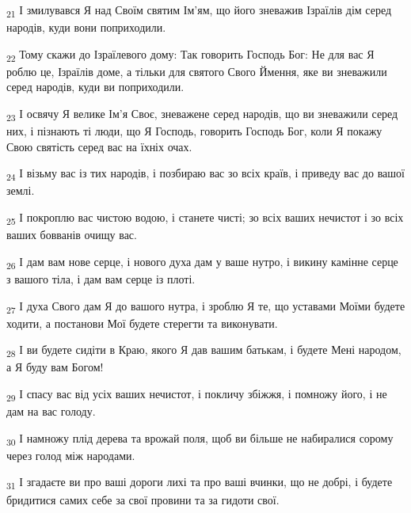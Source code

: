 \begin{tcolorbox}
\textsubscript{21} І змилувався Я над Своїм святим Ім'ям, що його зневажив Ізраїлів дім серед народів, куди вони поприходили.
\end{tcolorbox}
\begin{tcolorbox}
\textsubscript{22} Тому скажи до Ізраїлевого дому: Так говорить Господь Бог: Не для вас Я роблю це, Ізраїлів доме, а тільки для святого Свого Ймення, яке ви зневажили серед народів, куди ви поприходили.
\end{tcolorbox}
\begin{tcolorbox}
\textsubscript{23} І освячу Я велике Ім'я Своє, зневажене серед народів, що ви зневажили серед них, і пізнають ті люди, що Я Господь, говорить Господь Бог, коли Я покажу Свою святість серед вас на їхніх очах.
\end{tcolorbox}
\begin{tcolorbox}
\textsubscript{24} І візьму вас із тих народів, і позбираю вас зо всіх країв, і приведу вас до вашої землі.
\end{tcolorbox}
\begin{tcolorbox}
\textsubscript{25} І покроплю вас чистою водою, і станете чисті; зо всіх ваших нечистот і зо всіх ваших бовванів очищу вас.
\end{tcolorbox}
\begin{tcolorbox}
\textsubscript{26} І дам вам нове серце, і нового духа дам у ваше нутро, і викину камінне серце з вашого тіла, і дам вам серце із плоті.
\end{tcolorbox}
\begin{tcolorbox}
\textsubscript{27} І духа Свого дам Я до вашого нутра, і зроблю Я те, що уставами Моїми будете ходити, а постанови Мої будете стерегти та виконувати.
\end{tcolorbox}
\begin{tcolorbox}
\textsubscript{28} І ви будете сидіти в Краю, якого Я дав вашим батькам, і будете Мені народом, а Я буду вам Богом!
\end{tcolorbox}
\begin{tcolorbox}
\textsubscript{29} І спасу вас від усіх ваших нечистот, і покличу збіжжя, і помножу його, і не дам на вас голоду.
\end{tcolorbox}
\begin{tcolorbox}
\textsubscript{30} І намножу плід дерева та врожай поля, щоб ви більше не набиралися сорому через голод між народами.
\end{tcolorbox}
\begin{tcolorbox}
\textsubscript{31} І згадаєте ви про ваші дороги лихі та про ваші вчинки, що не добрі, і будете бридитися самих себе за свої провини та за гидоти свої.
\end{tcolorbox}
